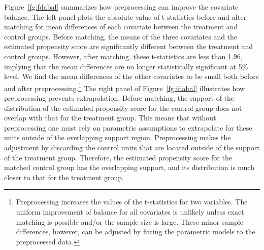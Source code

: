 \documentclass[11pt,titlepage]{article}
\begin{document}
Figure~\ref{fg:fdabal} summarizes how preprocessing can improve the
covariate balance. The left panel plots the absolute value of
t-statistics before and after matching for mean differences of each
covariate between the treatment and control groups.  Before matching,
the means of the three covariates and the estimated propensity score
are significantly different between the treatment and control groups.
However, after matching, these t-statistics are less than 1.96,
implying that the mean differences are no longer statistically
significant at 5\% level. We find the mean differences of the other
covariates to be small both before and after
preprocessing.\footnote{Preprocessing increases the values of the
  t-statistics for two variables. The uniform improvement of balance
  for all covariates is unlikely unless exact matching is possible
  and/or the sample size is large. These minor sample differences,
  however, can be adjusted by fitting the parametric models to the
  preprocessed data.} The right panel of Figure~\ref{fg:fdabal}
illustrates how preprocessing prevents extrapolation. Before matching,
the support of the distribution of the estimated propensity score for
the control group does not overlap with that for the treatment group.
This means that without preprocessing one must rely on parametric
assumptions to extrapolate for these units outside of the overlapping
support region.  Preprocessing makes the adjustment by discarding the
control units that are located outside of the support of the treatment
group. Therefore, the estimated propensity score for the matched
control group has the overlapping support, and its distribution is
much closer to that for the treatment group.
\end{document}
